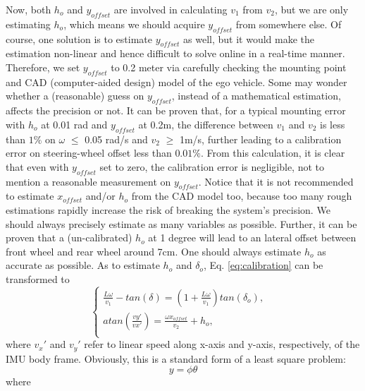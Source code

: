 \documentclass[letterpaper, 10 pt, conference]{ieeeconf}
\begin{document}
Now, both $h_o$ and $y_{offset}$ are involved in calculating $v_1$ from $v_2$, but we are only estimating $h_o$, which means we should acquire $y_{offset}$ from somewhere else. Of course, one solution is to estimate $y_{offset}$ as well, but it would make the estimation non-linear and hence difficult to solve online in a real-time manner. 
Therefore, we set $y_{offset}$ to 0.2 meter via carefully checking the mounting point and CAD (computer-aided design) model of the ego vehicle. Some may wonder whether a (reasonable) guess on $y_{offset}$, instead of a mathematical estimation, affects the precision or not. It can be proven that, for a typical mounting error with $h_o$ at 0.01 rad and $y_{offset}$ at 0.2m, the difference between $v_1$ and $v_2$ is less than $1\%$ on $\omega$ $\leq$ 0.05 rad/s and $v_2$ $\geq$ 1m/s, further leading to a calibration error on steering-wheel offset less than $0.01\%$. From this calculation, it is clear that even with $y_{offset}$ set to zero, the calibration error is negligible, not to mention a reasonable measurement on $y_{offset}$. Notice that it is not recommended to estimate $x_{offset}$ and/or $h_o$ from the CAD model too, because too many rough estimations rapidly increase the risk of breaking the system's
precision. We should always precisely estimate as many variables as possible. Further, it can be proven that a (un-calibrated) $h_o$ at 1 degree will lead to an lateral offset between front wheel and rear wheel around 7cm. One should always estimate $h_o$ as accurate as possible. As to estimate $h_o$ and $\delta_{o}$, Eq. \ref{eq:calibration} can be transformed to
\begin{equation}
\left\{
        \begin{array}{lr}
         \frac{L\omega}{v_1}-tan(\delta) = (1+\frac{L\omega}{v_1})tan(\delta_{o}), & \\
        atan(\frac{vy'}{vx'}) = \frac{\omega x_{offset}}{v_2} + h_o, & \\
        \end{array}
\right.
\end{equation}
where $v_x'$ and $v_y'$ refer to linear speed along x-axis and y-axis, respectively, of the IMU body frame. 
Obviously, this is a standard form of a least square problem:
\begin{equation}
    y = \phi\theta
\end{equation}
where 
\end{document}
